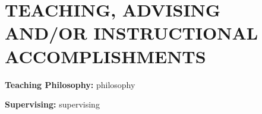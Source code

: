\section{TEACHING, ADVISING AND/OR INSTRUCTIONAL ACCOMPLISHMENTS}
\textbf{Teaching Philosophy:} {{philosophy}}

\textbf{Supervising:} {{supervising}}
